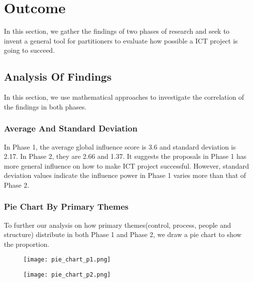 
\section{Outcome}
In this section, we gather the findings of two phases of research and seek to invent a general tool for partitioners to evaluate how possible a ICT project is going to succeed.

\subsection{Analysis Of Findings}

In this section, we use mathematical approaches to investigate the correlation of the findings in both phases.

\subsubsection{Average And Standard Deviation}
In Phase 1, the average global influence score is 3.6 and standard deviation
is 2.17. In Phase 2, they are 2.66 and 1.37. It suggests the proposals in Phase 1 has more general influence on how to make ICT project successful. However, standard deviation values indicate the influence power in Phase 1 varies more than that of Phase 2.
\subsubsection{Pie Chart By Primary Themes}
To further our analysis on how primary themes(control, process, people and structure) distribute in both Phase 1 and Phase 2, we draw a pie chart to show the proportion.

\begin{figure}
\centering
\begin{minipage}{.5\textwidth}
  \centering
  \texttt{[image: pie\_chart\_p1.png]}
  \label{pie:1}
\end{minipage}%
\begin{minipage}{.5\textwidth}
  \centering
  \texttt{[image: pie\_chart\_p2.png]}
  \label{pie:2}
\end{minipage}
\end{figure}

